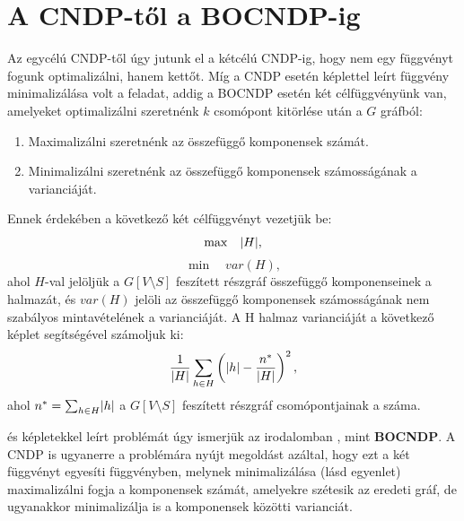 \section{A CNDP-től a BOCNDP-ig}

Az egycélú CNDP-től úgy jutunk el a kétcélú CNDP-ig, hogy nem egy függvényt fogunk optimalizálni, hanem kettőt.
Míg a CNDP esetén  képlettel leírt függvény minimalizálása volt a feladat,
addig a BOCNDP esetén két célfüggvényünk van, amelyeket optimalizálni szeretnénk $k$ csomópont kitörlése után a $G$ gráfból:
\begin{enumerate}
  \item Maximalizálni szeretnénk az összefüggő komponensek számát.
  \item Minimalizálni szeretnénk az összefüggő komponensek számosságának a varianciáját.
\end{enumerate}
Ennek érdekében a következő két célfüggvényt vezetjük be:
\begin{equation}\label{eqn:MAX_CONNECTED_COMPONENTS}
  \max \quad \lvert H\rvert,
\end{equation}
\begin{equation}\label{eqn:CARDINALITY_VARIANCE_COMPONENTS}
  \min \quad var(H),
\end{equation}
ahol $H$-val jelöljük a $G\left[ V \setminus S \right]$ feszített részgráf összefüggő komponenseinek a halmazát,
és $var(H)$ jelöli az összefüggő komponensek számosságának nem szabályos mintavételének a varianciáját.
A H halmaz varianciáját a következő képlet segítségével számoljuk ki:
\begin{equation}\label{eqn:CARDINALITY_VARIANCE_COMPONENTS}
  \dfrac{1}{ \lvert H\rvert } \sum_{h \in H} \left( \lvert h\rvert - \dfrac{ n^{*} }{ \lvert H\rvert } \right)^{2},
\end{equation}
ahol $n^{*} = \sum_{h \in H} \lvert h\rvert$ a $G\left[ V \setminus S \right]$ feszített részgráf csomópontjainak a száma.

 és 
képletekkel leírt problémát úgy ismerjük az irodalomban \cite{ventresca2018bi}, mint \textbf{BOCNDP}.
A CNDP is ugyanerre a problémára nyújt megoldást azáltal,
hogy ezt a két függvényt egyesíti  függvényben,
melynek minimalizálása (lásd  egyenlet) maximalizálni fogja a komponensek számát, amelyekre szétesik az eredeti gráf,
de ugyanakkor minimalizálja is a komponensek közötti varianciát.

